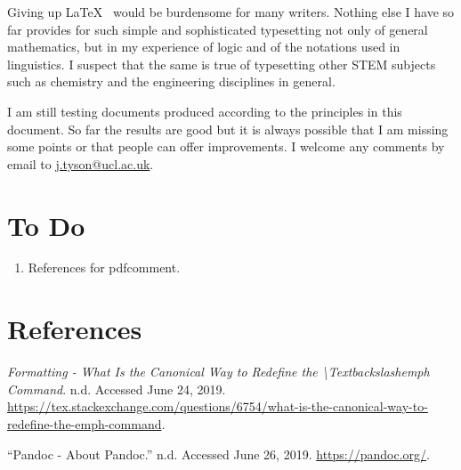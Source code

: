 \documentclass[]{article}
\begin{document}
Giving up \LaTeX~ would be burdensome for many writers. Nothing else I
have so far provides for such simple and sophisticated typesetting not
only of general mathematics, but in my experience of logic and of the
notations used in linguistics. I suspect that the same is true of
typesetting other STEM subjects such as chemistry and the engineering
disciplines in general.

I am still testing documents produced according to the principles in
this document. So far the results are good but it is always possible
that I am missing some points or that people can offer improvements. I
welcome any comments by email to
\href{my\%20ucl\%20email\%20address}{j.tyson@ucl.ac.uk}.

\hypertarget{to-do}{%
\section{To Do}\label{to-do}}

\begin{enumerate}
\def\labelenumi{\arabic{enumi}.}
\item
  References for pdfcomment.
\end{enumerate}
\hypertarget{references}{%
\section*{References}\label{references}}

\hypertarget{refs}{}
\leavevmode\hypertarget{ref-defineemph}{}%
\emph{Formatting - What Is the Canonical Way to Redefine the
\textbackslash{}Textbackslashemph Command}. n.d. Accessed June 24, 2019.
\url{https://tex.stackexchange.com/questions/6754/what-is-the-canonical-way-to-redefine-the-emph-command}.

\leavevmode\hypertarget{ref-pandoc}{}%
``Pandoc - About Pandoc.'' n.d. Accessed June 26, 2019.
\url{https://pandoc.org/}.
\end{document}
